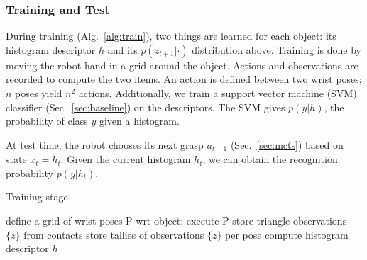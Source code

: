 \documentclass[letterpaper, 10 pt, conference]{ieeeconf}  %
\newcommand{\TODO}[1]{{\color{red}TODO: #1}}
\begin{document}
\subsubsection{Training and Test}

During training (Alg.~\ref{alg:train}), two things are learned for each object: its histogram descriptor $h$ and its $p(z_{t+1} | \cdot)$ distribution above. Training is done by moving the robot hand in a grid \cite{triangles} around the object. Actions and observations are recorded to compute the two items.
An action is defined between two wrist poses; $n$ poses yield $n^2$ actions.
%
Additionally, we train a support vector machine (SVM) classifier (Sec.~\ref{sec:baseline}) on the descriptors. The SVM gives $p(y | h)$, the probability of class $y$ given a histogram.

At test time, the robot chooses its next grasp $a_{t+1}$ (Sec.~\ref{sec:mcts}) based on state $x_t = h_t$. %
Given the current histogram $h_t$, we can obtain the recognition probability $p(y | h_t)$.



\setlength{\intextsep}{2pt}  %
\setlength{\textfloatsep}{2pt}  %
\setlength{\floatsep}{0pt}  %
\begin{algorithm}[htbp]
\caption{Training stage}
\label{alg:train}
{
  define a grid of wrist poses P wrt object; execute P\;
  store triangle observations $\{z\}$ from contacts\;
  store tallies of observations $\{z\}$ per pose\;
  compute histogram descriptor $h$\;
}
\end{algorithm}
\end{document}
